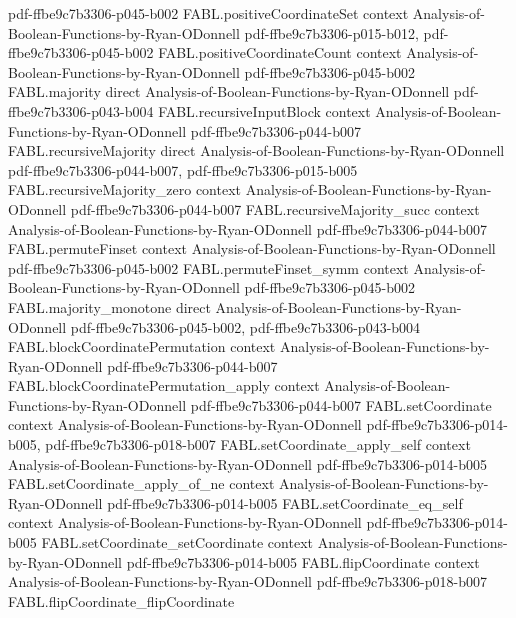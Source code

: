 \begin{theorem}
  {pdf-ffbe9c7b3306-p045-b002}
\proofstep
  {FABL.positiveCoordinateSet}
  {context}
  {Analysis-of-Boolean-Functions-by-Ryan-ODonnell}
  {pdf-ffbe9c7b3306-p015-b012,
    pdf-ffbe9c7b3306-p045-b002}
\proofstep
  {FABL.positiveCoordinateCount}
  {context}
  {Analysis-of-Boolean-Functions-by-Ryan-ODonnell}
  {pdf-ffbe9c7b3306-p045-b002}
\proofstep
  {FABL.majority}
  {direct}
  {Analysis-of-Boolean-Functions-by-Ryan-ODonnell}
  {pdf-ffbe9c7b3306-p043-b004}
\proofstep
  {FABL.recursiveInputBlock}
  {context}
  {Analysis-of-Boolean-Functions-by-Ryan-ODonnell}
  {pdf-ffbe9c7b3306-p044-b007}
\proofstep
  {FABL.recursiveMajority}
  {direct}
  {Analysis-of-Boolean-Functions-by-Ryan-ODonnell}
  {pdf-ffbe9c7b3306-p044-b007,
    pdf-ffbe9c7b3306-p015-b005}
\proofstep
  {FABL.recursiveMajority_zero}
  {context}
  {Analysis-of-Boolean-Functions-by-Ryan-ODonnell}
  {pdf-ffbe9c7b3306-p044-b007}
\proofstep
  {FABL.recursiveMajority_succ}
  {context}
  {Analysis-of-Boolean-Functions-by-Ryan-ODonnell}
  {pdf-ffbe9c7b3306-p044-b007}
\proofstep
  {FABL.permuteFinset}
  {context}
  {Analysis-of-Boolean-Functions-by-Ryan-ODonnell}
  {pdf-ffbe9c7b3306-p045-b002}
\proofstep
  {FABL.permuteFinset_symm}
  {context}
  {Analysis-of-Boolean-Functions-by-Ryan-ODonnell}
  {pdf-ffbe9c7b3306-p045-b002}
\proofstep
  {FABL.majority_monotone}
  {direct}
  {Analysis-of-Boolean-Functions-by-Ryan-ODonnell}
  {pdf-ffbe9c7b3306-p045-b002,
    pdf-ffbe9c7b3306-p043-b004}
\proofstep
  {FABL.blockCoordinatePermutation}
  {context}
  {Analysis-of-Boolean-Functions-by-Ryan-ODonnell}
  {pdf-ffbe9c7b3306-p044-b007}
\proofstep
  {FABL.blockCoordinatePermutation_apply}
  {context}
  {Analysis-of-Boolean-Functions-by-Ryan-ODonnell}
  {pdf-ffbe9c7b3306-p044-b007}
\proofstep
  {FABL.setCoordinate}
  {context}
  {Analysis-of-Boolean-Functions-by-Ryan-ODonnell}
  {pdf-ffbe9c7b3306-p014-b005,
    pdf-ffbe9c7b3306-p018-b007}
\proofstep
  {FABL.setCoordinate_apply_self}
  {context}
  {Analysis-of-Boolean-Functions-by-Ryan-ODonnell}
  {pdf-ffbe9c7b3306-p014-b005}
\proofstep
  {FABL.setCoordinate_apply_of_ne}
  {context}
  {Analysis-of-Boolean-Functions-by-Ryan-ODonnell}
  {pdf-ffbe9c7b3306-p014-b005}
\proofstep
  {FABL.setCoordinate_eq_self}
  {context}
  {Analysis-of-Boolean-Functions-by-Ryan-ODonnell}
  {pdf-ffbe9c7b3306-p014-b005}
\proofstep
  {FABL.setCoordinate_setCoordinate}
  {context}
  {Analysis-of-Boolean-Functions-by-Ryan-ODonnell}
  {pdf-ffbe9c7b3306-p014-b005}
\proofstep
  {FABL.flipCoordinate}
  {context}
  {Analysis-of-Boolean-Functions-by-Ryan-ODonnell}
  {pdf-ffbe9c7b3306-p018-b007}
\proofstep
  {FABL.flipCoordinate_flipCoordinate}

\end{theorem}
